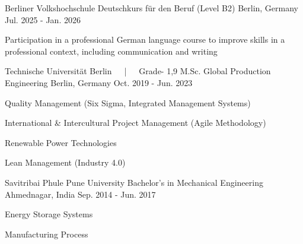 

\begin{cventries}

  \cventry
    {Berliner Volkshochschule} %
    {Deutschkurs für den Beruf (Level B2)} %
    {Berlin, Germany} %
    {Jul. 2025 - Jan. 2026} %
    {
      \begin{cvitems} %
        \item {Participation in a professional German language course to improve skills in a professional context, including communication and writing}
      \end{cvitems}
    }
    
  \cventry
    {Technische Universität Berlin~~~|~~~Grade- 1,9} %
    {M.Sc. Global Production Engineering} %
    {Berlin, Germany} %
    {Oct. 2019 - Jun. 2023} %
    {
      \begin{cvitems} %
        \item {Quality Management (Six Sigma, Integrated Management Systems)}
        \item {International \& Intercultural Project Management (Agile Methodology)}
        \item {Renewable Power Technologies}
        \item {Lean Management (Industry 4.0)}
     \end{cvitems}
    }
    
  \cventry
    {Savitribai Phule Pune University} %
    {Bachelor’s in Mechanical Engineering} %
    {Ahmednagar, India} %
    {Sep. 2014 - Jun. 2017} %
    {
      \begin{cvitems} %
        \item {{Energy Storage Systems}}
        \item {{Manufacturing Process}}
     \end{cvitems}
    }
    

\end{cventries}
